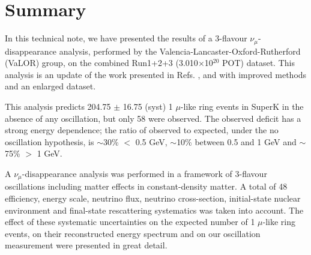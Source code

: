 \clearpage


\section {Summary}
\label{sec:summary}

In this technical note,
we have presented the results of a 3-flavour $\nu_{\mu}$-disappearance analysis,
performed by the Valencia-Lancaster-Oxford-Rutherford (VaLOR) group,
on the combined Run1+2+3 (3.010$\times$10$^{20}$ POT) dataset.
This analysis is an update of the work presented in
Refs. \cite{OurRun1DisappAnalysis}, \cite{OurRun12DisappAnalysis} and \cite{OurRun12DisappAnalysis3Flavour}
with improved methods and an enlarged dataset.

This analysis predicts 204.75 $\pm$ 16.75 (syst)
1 $\mu$-like ring events in SuperK in the absence of any oscillation,
but only 58 were observed. The observed deficit has a strong energy dependence;
the ratio of observed to expected, under the no oscillation hypothesis, is
$\sim$30\% $<$ 0.5 GeV, 
$\sim$10\% between 0.5 and 1 GeV and 
$\sim$75\% $>$ 1 GeV.

A $\nu_{\mu}$-disappearance analysis was performed 
in a framework of 3-flavour oscillations including matter effects in constant-density matter.
A total of 48 efficiency, energy scale, neutrino flux, neutrino cross-section,
initial-state nuclear environment and final-state rescattering systematics was taken into account.
The effect of these systematic uncertainties on the expected number of 1 $\mu$-like ring events,
on their reconstructed energy spectrum and on our oscillation measurement were presented in great detail.


